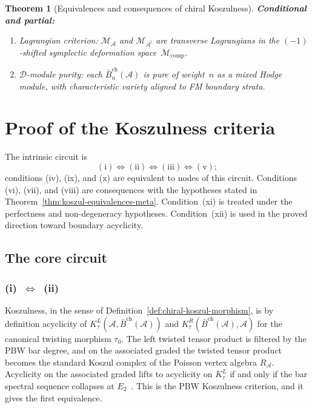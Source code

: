 \documentclass[11pt,reqno]{amsart}
\newtheorem{theorem}{Theorem}[section]
\theoremstyle{definition}
\theoremstyle{remark}
\newcommand{\cA}{\mathcal{A}}
\newcommand{\cM}{\mathcal{M}}
\newcommand{\cD}{\mathcal{D}}
\newcommand{\barBgeom}{\bar{B}^{\mathrm{ch}}}
\numberwithin{equation}{section}
\begin{document}
\begin{theorem}[Equivalences and consequences of chiral Koszulness]
\smallskip
\noindent\textbf{Conditional and partial:}
\begin{enumerate}[label=\textup{(\roman*)},leftmargin=2.4em,start=11]
\item \emph{Lagrangian criterion:} $\cM_\cA$ and $\cM_{\cA^!}$
 are transverse Lagrangians in the $(-1)$-shifted symplectic
 deformation space~$\cM_{\mathrm{comp}}$.
\item $\cD$-\emph{module purity:} each $\barBgeom_n(\cA)$ is pure
 of weight~$n$ as a mixed Hodge module, with characteristic
 variety aligned to FM boundary strata.
\end{enumerate}
\end{theorem}

\section{Proof of the Koszulness criteria}
\label{sec:proof}

The intrinsic circuit is
\[
(\mathrm{i}) \Leftrightarrow (\mathrm{ii})
\Leftrightarrow (\mathrm{iii})
\Leftrightarrow (\mathrm{v});
\]
conditions \textup{(iv)}, \textup{(ix)}, and \textup{(x)} are
equivalent to nodes of this circuit. Conditions \textup{(vi)},
\textup{(vii)}, and \textup{(viii)} are consequences with the
hypotheses stated in Theorem~\ref{thm:koszul-equivalences-meta}.
Condition~\textup{(xi)} is treated under the perfectness and
non-degeneracy hypotheses. Condition~\textup{(xii)} is used in the
proved direction toward boundary acyclicity.

\subsection{The core circuit}

\subsubsection*{\textup{(i)}~$\Leftrightarrow$~\textup{(ii)}}

Koszulness, in the sense of
Definition~\ref{def:chiral-koszul-morphism}, is by definition
acyclicity of $K_\tau^L(\cA,\barBgeom(\cA))$ and
$K_\tau^R(\barBgeom(\cA),\cA)$ for the canonical twisting morphism
$\tau_0$. The left twisted tensor product is filtered by the PBW
bar degree, and on the associated graded the twisted tensor product
becomes the standard Koszul complex of the Poisson vertex algebra
$R_\cA$. Acyclicity on the associated graded lifts to acyclicity on
$K_\tau^L$ if and only if the bar spectral sequence collapses at
$E_2$~\cite[Thm.~4.2.1]{LorgatMKD1}. This is the PBW Koszulness
criterion, and it gives the first equivalence.
\end{document}
